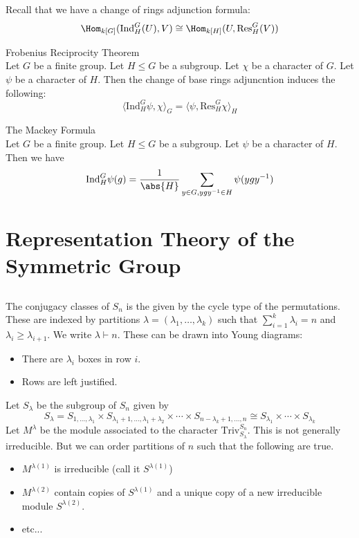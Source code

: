 \documentclass[a4paper]{article}
\begin{document}
Recall that we have a change of rings adjunction formula: $$\Hom_{k[G]}(\text{Ind}_H^G(U),V)\cong\Hom_{k[H]}(U,\text{Res}_H^G(V))$$

\begin{thm}{Frobenius Reciprocity Theorem}{}\\
Let $G$ be a finite group. Let $H\leq G$ be a subgroup. Let $\chi$ be a character of $G$. Let $\psi$ be a character of $H$. Then the change of base rings adjuncntion induces the following: $$\langle\text{Ind}_H^G\psi,\chi\rangle_G=\langle\psi,\text{Res}_H^G\chi\rangle_H$$
\end{thm}

\begin{prp}{The Mackey Formula}{}\\
Let $G$ be a finite group. Let $H\leq G$ be a subgroup. Let $\psi$ be a character of $H$. 
Then we have $$\text{Ind}_H^G\psi(g)=\frac{1}{\abs{H}}\sum_{y\in G, ygy^{-1}\in H}\psi(ygy^{-1})$$
\end{prp}

\pagebreak
\section{Representation Theory of the Symmetric Group}
\subsection{}
The conjugacy classes of $S_n$ is the given by the cycle type of the permutations. These are indexed by partitions $\lambda=(\lambda_1,\dots,\lambda_k)$ such that $\sum_{i=1}^k\lambda_i=n$ and $\lambda_i\geq\lambda_{i+1}$. We write $\lambda\vdash n$. These can be drawn into Young diagrams: 
\begin{itemize}
\item There are $\lambda_i$ boxes in row $i$. 
\item Rows are left justified. 
\end{itemize}

Let $S_\lambda$ be the subgroup of $S_n$ given by $$S_\lambda=S_{1,\dots,\lambda_1}\times S_{\lambda_1+1,\dots,\lambda_1+\lambda_2}\times\cdots\times S_{n-\lambda_k+1,\dots,n}\cong S_{\lambda_1}\times\cdots\times S_{\lambda_k}$$ Let $M^\lambda$ be the module associated to the character $\text{Triv}_{S_\lambda}^{S_n}$. This is not generally irreducible. But we can order partitions of $n$ such that the following are true. 
\begin{itemize}
\item $M^{\lambda(1)}$ is irreducible (call it $S^{\lambda(1)}$)
\item $M^{\lambda(2)}$ contain copies of $S^{\lambda(1)}$ and a unique copy of a new irreducible module $S^{\lambda(2)}$. 
\item etc... 
\end{itemize}
\end{document}
